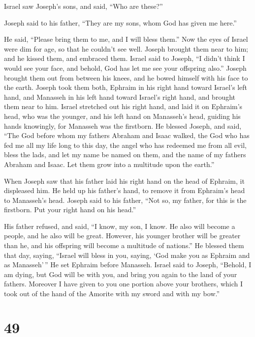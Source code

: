  Israel saw Joseph's sons, and said, ``Who are these?''

 Joseph said to his father, ``They are my sons, whom God has
given me here.''

He said, ``Please bring them to me, and I will bless them.''
 Now the eyes of Israel were dim for age, so that he
couldn't see well. Joseph brought them near to him; and he kissed them,
and embraced them.  Israel said to Joseph, ``I didn't think
I would see your face, and behold, God has let me see your offspring
also.''  Joseph brought them out from between his knees,
and he bowed himself with his face to the earth.  Joseph
took them both, Ephraim in his right hand toward Israel's left hand, and
Manasseh in his left hand toward Israel's right hand, and brought them
near to him.  Israel stretched out his right hand, and laid
it on Ephraim's head, who was the younger, and his left hand on
Manasseh's head, guiding his hands knowingly, for Manasseh was the
firstborn.  He blessed Joseph, and said, ``The God before
whom my fathers Abraham and Isaac walked, the God who has fed me all my
life long to this day,  the angel who has redeemed me from
all evil, bless the lads, and let my name be named on them, and the name
of my fathers Abraham and Isaac. Let them grow into a multitude upon the
earth.''

 When Joseph saw that his father laid his right hand on the
head of Ephraim, it displeased him. He held up his father's hand, to
remove it from Ephraim's head to Manasseh's head.  Joseph
said to his father, ``Not so, my father, for this is the firstborn. Put
your right hand on his head.''

 His father refused, and said, ``I know, my son, I know. He
also will become a people, and he also will be great. However, his
younger brother will be greater than he, and his offspring will become a
multitude of nations.''  He blessed them that day, saying,
``Israel will bless in you, saying, `God make you as Ephraim and as
Manasseh'\,'' He set Ephraim before Manasseh.  Israel said
to Joseph, ``Behold, I am dying, but God will be with you, and bring you
again to the land of your fathers.  Moreover I have given
to you one portion above your brothers, which I took out of the hand of
the Amorite with my sword and with my bow.''

\hypertarget{section-48}{%
\section{49}\label{section-48}}

